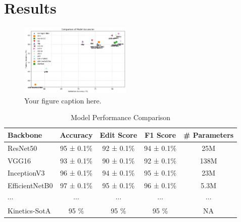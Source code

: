 \section{Results}

\begin{figure}[H]
    \centering
    \includegraphics[width=0.475\textwidth]{assets/figures/models-scores.png}
    \caption{Your figure caption here.}
    \label{figure:models-performances}
\end{figure}

\begin{table}[h]
    \centering
    \tiny
    \begin{tabular}{|l|c|c|c|c|}
    \hline
    \textbf{Backbone} & \textbf{Accuracy} & \textbf{Edit Score} & \textbf{F1 Score} & \textbf{\# Parameters} \\
    \hline
    ResNet50          & 95 ± 0.1\%              & 92 ± 0.1\%                & 94 ± 0.1\%              & 25M                   \\
    VGG16             & 93 ± 0.1\%              & 90 ± 0.1\%                & 92 ± 0.1\%              & 138M                  \\
    InceptionV3       & 96 ± 0.1\%              & 94 ± 0.1\%                & 95 ± 0.1\%              & 23M                   \\
    EfficientNetB0    & 97 ± 0.1\%              & 95 ± 0.1\%                & 96 ± 0.1\%              & 5.3M                  \\
    $\cdots$            & $\cdots$                  & $\cdots$                    & $\cdots$                  & $\cdots$                \\
    Kinetics-SotA     & 95 \%                   & 95 \%                     & 95 \%                   & NA                    \\
    \hline
    \end{tabular}
    \caption{Model Performance Comparison}
    \label{table:models-performances}
\end{table}


